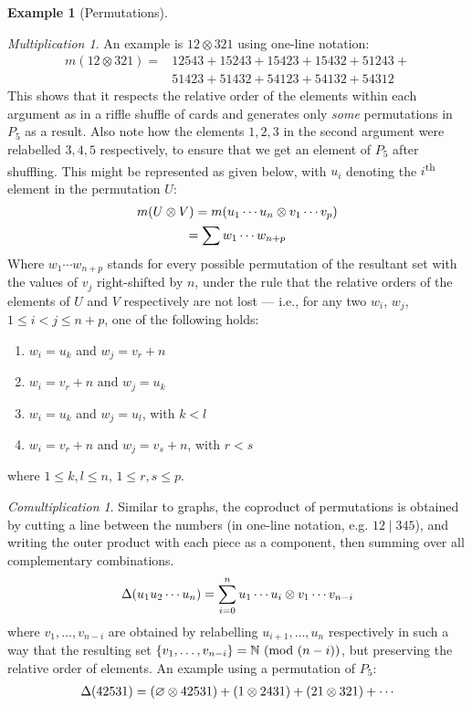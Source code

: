 \documentclass{article}
\theoremstyle{definition}
\newtheorem{Example}{Example}
\theoremstyle{remark}
\theoremstyle{underline}
\newtheorem*{Multiplication*}{Multiplication}
\theoremstyle{underline}
\newtheorem*{Comultiplication*}{Comultiplication}
\newcommand{\Mod}[1]{\ (\mathrm{mod}\ #1)}
\renewcommand{\th}{\textsuperscript{th}\xspace}
\begin{document}
\begin{Example}[Permutations]
		\begin{Multiplication*}
			An example is $12 \otimes 321$ using one-line notation:
			\begin{align*}
			m(12 \otimes 321) = & 12543 + 15243 + 15423 + 15432 + 51243 + {}\\
				& 51423 +  51432 + 54123 + 54132 + 54312
			\end{align*}
			This shows that it respects the relative order of the elements within each argument as in a riffle shuffle of cards and generates only \emph{some} permutations in $P_5$ as a result. Also note how the elements $1, 2, 3$ in the second argument were relabelled $3, 4, 5$ respectively, to ensure that we get an element of $P_5$ after shuffling. This might be represented as given below, with $u_i$ denoting the $i$\th element in the permutation $U$:
			\begin{gather*}
			m\pqty{U \otimes V} = m\pqty{u_1 \cdots u_n \otimes v_1 \cdots v_p} \\
			= \sum w_1 \cdots w_{n + p}
			\end{gather*}
			Where $w_1 \cdots w_{n + p}$ stands for every possible permutation of the resultant set with the values of $v_j$ right-shifted by $n$, under the rule that the relative orders of the elements of $U$ and $V$ respectively are not lost --- i.e., for any two $w_i$, $w_j$, $1 \le i < j \le n + p$, one of the following holds:
			\begin{enumerate}
				\item $w_i = u_k$ and $w_j = v_r + n$ 
				\item $w_i = v_r + n$ and $w_j = u_k$
				\item $w_i = u_k$ and $w_j = u_l$, with $k < l$
				\item $w_i = v_r + n$ and $w_j = v_s + n$, with $r < s$
			\end{enumerate}
			where $1 \le k, l \le n$, $1 \le r, s \le p$.
		\end{Multiplication*}
		
		\begin{Comultiplication*}
			Similar to graphs, the coproduct of permutations is obtained by cutting a line between the numbers (in one-line notation, e.g. $12 \mid 345$), and writing the outer product with each piece as a component, then summing over all complementary combinations. 
			\begin{gather*}
			\Delta\pqty{u_1 u_2 \cdots u_n} = \sum_{i=0}^n u_1 \cdots u_i \otimes v_1 \cdots v_{n - i}
			\end{gather*}
			where $v_1, \ldots, v_{n - i}$ are obtained by relabelling $u_{i + 1}, \ldots, u_n$ respectively in such a way that the resulting set $\qty{v_1, \ldots, v_{n - i}} = \mathbb N \Mod {(n - i)}$, but preserving the relative order of elements. An example using a permutation of $P_5$:
			\begin{gather*}
			\Delta\pqty{42531} = \pqty{\varnothing \otimes 42531} + \pqty{1 \otimes 2431} + \pqty{21 \otimes 321} + \cdots
			\end{gather*}
		\end{Comultiplication*}
		

\end{Example}
\end{document}
